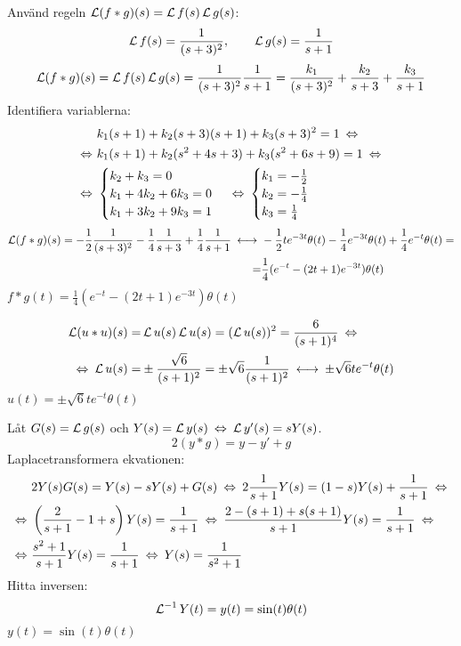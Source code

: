 \begin{task}{6.6}
	Använd regeln $\laplace (f*g)(s)=\laplace f(s)\*\laplace g(s)$:
	\[\operatorname{\mathcal{L}} f(s)=\frac{1}{(s+3)^2},\qquad
	\operatorname{\mathcal{L}} g(s)=\frac{1}{s+1}\]
	\begin{align*}
	\laplace(f*g)(s)=
	\laplace f(s)\*\laplace g(s)=
	\frac{1}{(s+3)^2}\*\frac{1}{s+1}=
	\frac{k_1}{(s+3)^2}+\frac{k_2}{s+3}+\frac{k_3}{s+1}
	\end{align*}
	Identifiera variablerna:
	\begin{align*}
	&k_1(s+1)+k_2(s+3)(s+1)+k_3(s+3)^2=1 \lra \\ \lra
	&k_1(s+1)+k_2(s^2+4s+3)+k_3(s^2+6s+9)=1 \lra \\ \lra
	&\begin{cases}
	k_2+k_3=0 \\
	k_1+4k_2+6k_3=0 \\
	k_1+3k_2+9k_3=1
	\end{cases} \lra
	\begin{cases}
	k_1=-\frac{1}{2} \\
	k_2=-\frac{1}{4} \\
	k_3=\frac{1}{4}
	\end{cases}
	\end{align*}
	\begin{align*}
	\laplace (f*g)(s)=
	-\frac{1}{2}\*\frac{1}{(s+3)^2}-\frac{1}{4}\*\frac{1}{s+3}+\frac{1}{4}\*\frac{1}{s+1} \llra
	&-\frac{1}{2}te^{-3t}\theta(t)-\frac{1}{4}e^{-3t}\theta(t)+\frac{1}{4}e^{-t}\theta(t)= \\ =
	&\frac{1}{4}(e^{-t}-(2t+1)e^{-3t})\theta(t)
	\end{align*}
	\ans $f*g(t)=\frac{1}{4}(e^{-t}-(2t+1)e^{-3t})\theta(t)$
\end{task}

\begin{task}{6.7}
	\begin{align*}
	\laplace (u*u)(s)=
	&\laplace u(s)\*\laplace u(s)=
	(\laplace u(s))^2=
	\frac{6}{(s+1)^4} \lra \\ \lra
	\laplace u(s)=
	&\pm\frac{\sqrt{6}}{(s+1)^2}=
	\pm\sqrt{6}\frac{1}{(s+1)^2}\llra
	\pm\sqrt{6}te^{-t}\theta(t)
	\end{align*}
	\ans $u(t)=\pm\sqrt{6}te^{-t}\theta(t)$
\end{task}

\begin{task}{6.8}
	Låt $G(s)=\operatorname{\mathcal{L}} g(s)$ och $Y(s)=\laplace y(s) \lra \laplace y'(s)=sY(s)$.
	\[2(y*g)=y-y'+g\]
	Laplacetransformera ekvationen:
	\begin{align*}
	&2Y(s)G(s)=Y(s)-sY(s)+G(s) \lra
	2\frac{1}{s+1}Y(s)=(1-s)Y(s)+\frac{1}{s+1} \lra \\ \lra
	&\left(\frac{2}{s+1}-1+s\right)Y(s)=\frac{1}{s+1} \lra
	\frac{2-(s+1)+s(s+1)}{s+1}Y(s)=\frac{1}{s+1} \lra \\ \lra
	&\frac{s^2+1}{s+1}Y(s)=\frac{1}{s+1} \lra
	Y(s)=\frac{1}{s^2+1}
	\end{align*}
	Hitta inversen:
	\begin{align*}
	\operatorname{\mathcal{L}}^{-1}Y(t)=y(t)=\sin(t)\theta(t)
	\end{align*}
	\ans $y(t)=\sin(t)\theta(t)$
\end{task}

